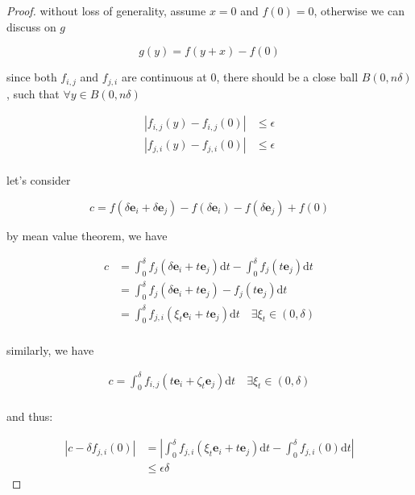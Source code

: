 \begin{proof}
    without loss of generality, assume $x = 0$ and $f(0) = 0$, otherwise we can discuss on $g$  
    
    \[
    g(y) = f(y+x) - f(0)
    \]

    since both $f_{i,j}$ and $f_{j,i}$ are continuous at $0$, there should be a close ball $B(0,n\delta)$, 
    such that $\forall y \in B(0, n\delta)$
    
    \begin{align*}
    \left| f_{i,j}(y) - f_{i,j}(0) \right| &\le \epsilon \\
    \left| f_{j,i}(y) - f_{j,i}(0) \right| &\le \epsilon \\
    \end{align*}

    let's consider

    \[
        c = f(\delta \mathbf{e}_i + \delta \mathbf{e}_j) - f(\delta \mathbf{e}_i) - f(\delta \mathbf{e}_j) + f(0)
    \]

    by mean value theorem, we have

    \begin{align*}
        c &= \int_{0}^{\delta} f_{j}(\delta \mathbf{e}_i + t \mathbf{e}_j) \mathrm{d}t - \int_{0}^{\delta} f_{j}( t \mathbf{e}_j) \mathrm{d}t  \\
        &= \int_{0}^{\delta} f_{j}(\delta \mathbf{e}_i + t \mathbf{e}_j) -  f_{j}( t \mathbf{e}_j) \mathrm{d}t \\
        &= \int_{0}^{\delta} f_{j,i}(\xi_t\mathbf{e}_i + t \mathbf{e}_j) \mathrm{d}t \quad \exists \xi_t \in (0, \delta)\\ 
    \end{align*}

    similarly, we have


    \begin{align*}
        c = \int_{0}^{\delta} f_{i,j}(t\mathbf{e}_i + \zeta_t \mathbf{e}_j) \mathrm{d}t \quad \exists \xi_t \in (0, \delta)\\ 
    \end{align*}

    and thus:

    \begin{align*}
       \left| c - \delta f_{j,i}(0) \right| &= \left| \int_{0}^{\delta} f_{j,i}(\xi_t\mathbf{e}_i + t \mathbf{e}_j) \mathrm{d}t  - \int_0^{\delta} f_{j,i}(0) \mathrm{d}t \right| \\
       & \le  \epsilon \delta
    \end{align*}


\end{proof}

